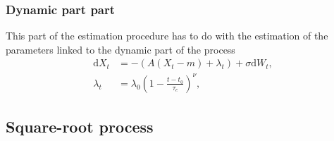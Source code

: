 \subsubsection{Dynamic part part}\label{subsubsec:OUprocessDynamic}
This part of the estimation procedure has to do with the estimation of the parameters linked to the dynamic part of the process
\begin{align}
    \mathrm{d}X_t &= -\left(A\left(X_t - m\right) + \lambda_t\right) + \sigma \mathrm{d}W_t,\\
    \lambda_t &= \lambda_0\left(1 - \frac{t - t_0}{\tau_c}\right)^\nu,
\end{align}
\subsection{Square-root process}\label{subsec:squareroot}

